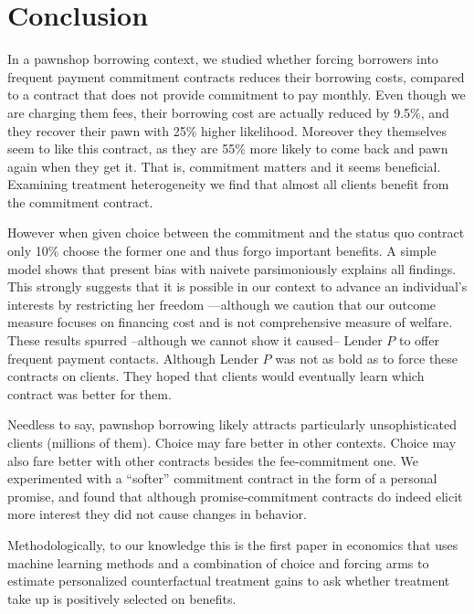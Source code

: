 \documentclass[oneside,11pt]{article}
\begin{document}
    
\section{Conclusion} \label{conclusion}

In a pawnshop borrowing context, we studied whether forcing borrowers into frequent payment commitment contracts reduces their borrowing costs, compared to a contract that does not provide commitment to pay monthly. Even though we are charging them fees, their borrowing cost are actually reduced by 9.5\%, and they recover their pawn with 25\% higher likelihood. Moreover they themselves seem to like this contract, as they are 55\% more likely to come back and pawn again when they get it. That is, commitment matters and it seems beneficial. Examining treatment heterogeneity we find that almost all clients benefit from the commitment contract. 

However when given choice between the commitment and the status quo contract only 10\% choose the former one and thus forgo important benefits. A simple model shows that present bias with naivete parsimoniously explains all findings. This strongly suggests that it is possible in our context to advance an individual's interests by restricting her freedom ---although we caution that our outcome measure focuses on financing cost and is not comprehensive measure of welfare. These results spurred --although we cannot show it caused-- Lender $P$ to offer frequent payment contacts. Although Lender $P$ was not as bold as to force these contracts on clients. They hoped that clients would eventually learn which contract was better for them.

Needless to say, pawnshop borrowing likely attracts particularly unsophisticated clients (millions of them). Choice may fare better in other contexts.  Choice may also fare better with other contracts besides the fee-commitment one. We experimented with a ``softer'' commitment contract in the form of a personal promise, and found that although promise-commitment contracts do indeed elicit more interest they did not cause changes in behavior. 

Methodologically, to our knowledge this is the first paper in economics that uses machine learning methods and a combination of choice and forcing arms to estimate personalized counterfactual treatment gains to ask whether treatment take up is positively selected on benefits.
\end{document}
